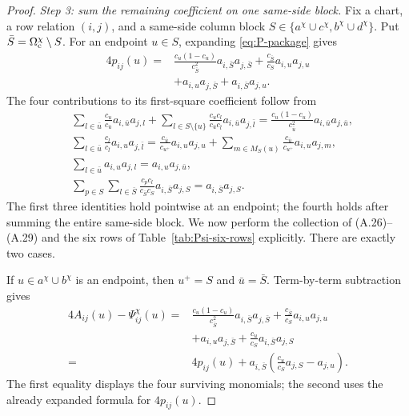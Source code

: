 \documentclass[11pt]{article}
\begin{document}
\begin{proof}
\emph{Step 3: sum the remaining coefficient on one same-side block.}
Fix a chart, a row relation $(i,j)$, and a same-side column block
$S\in\{a^\chi\cup c^\chi,b^\chi\cup d^\chi\}$.  Put
$\bar S=\Omega_{\rm c}^\chi\setminus S$.  For an endpoint $u\in S$,
expanding \eqref{eq:P-package} gives
\[
\begin{aligned}
4p_{ij}(u)
={}&\frac{c_u(1-c_u)}{c_{\bar S}^{2}}
      a_{i,\bar S}a_{j,\bar S}
+\frac{c_{\bar S}}{c_S}a_{i,u}a_{j,u}\\
&+a_{i,u}a_{j,\bar S}+a_{i,\bar S}a_{j,u}.
\end{aligned}
\]
The four contributions to its first-square coefficient follow from
\begin{align*}
&\sum_{l\in\bar u}\frac{c_u}{c_{\bar u}}a_{i,\bar u}a_{j,l}
+\sum_{l\in S\setminus\{u\}}
 \frac{c_uc_l}{c_{\bar u}c_{\bar l}}
 a_{i,\bar u}a_{j,\bar l}
=\frac{c_u(1-c_u)}{c_{\bar u}^2}
 a_{i,\bar u}a_{j,\bar u},\\
&\sum_{l\in\bar u}\frac{c_l}{c_{\bar l}}a_{i,u}a_{j,\bar l}
=\frac{c_{\bar u}}{c_{u^+}}a_{i,u}a_{j,u}
+\sum_{m\in M_S(u)}
 \frac{c_{\bar u}}{c_{u^+}}a_{i,u}a_{j,m},\\
&\sum_{l\in\bar u}a_{i,u}a_{j,l}
=a_{i,u}a_{j,\bar u},\\
&\sum_{p\in S}\sum_{l\in\bar S}
 \frac{c_pc_l}{c_{\bar S}c_S}
 a_{i,\bar S}a_{j,S}
=a_{i,\bar S}a_{j,S}.
\end{align*}
The first three identities hold pointwise at an endpoint; the fourth holds
after summing the entire same-side block.  We now perform the collection of
(A.26)--(A.29) and the six rows of Table~\ref{tab:Psi-six-rows} explicitly.
There are exactly two cases.

If $u\in a^\chi\cup b^\chi$ is an endpoint, then $u^+=S$ and
$\bar u=\bar S$.  Term-by-term subtraction gives
\[
\begin{aligned}
4A_{ij}(u)-\Psi_{ij}^{\chi}(u)
={}&
\frac{c_u(1-c_u)}{c_{\bar S}^2}
 a_{i,\bar S}a_{j,\bar S}
+\frac{c_{\bar S}}{c_S}a_{i,u}a_{j,u}\\
&+a_{i,u}a_{j,\bar S}
+\frac{c_u}{c_S}a_{i,\bar S}a_{j,S}\\
={}&4p_{ij}(u)
+a_{i,\bar S}\left(
\frac{c_u}{c_S}a_{j,S}-a_{j,u}\right).
\end{aligned}
\]
The first equality displays the four surviving monomials; the second uses
the already expanded formula for $4p_{ij}(u)$.


\end{proof}
\end{document}
